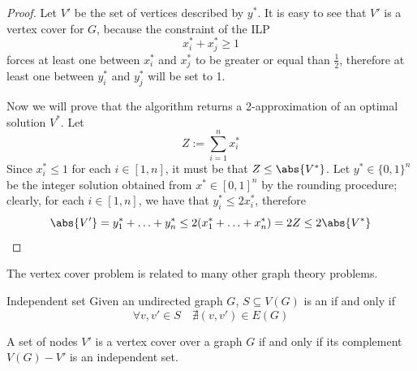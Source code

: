 \documentclass[a4paper, 12pt]{report}
\begin{document}

    \begin{proof}
        Let $V'$ be the set of vertices described by $y^*$. It is easy to see that $V'$ is a vertex cover for $G$, because the constraint of the ILP $$x^*_i + x^*_j \ge 1$$ forces at least one between $x^*_i$ and $x^*_j$ to be greater or equal than $\frac{1}{2}$, therefore at least one between $y^*_i$ and $y_j^*$ will be set to 1.

        Now we will prove that the algorithm returns a 2-approximation of an optimal solution $V^*$. Let $$Z := \sum_{i = 1}^n{x^*_i}$$ Since $x^*_i \le 1$ for each $i \in [1, n]$, it must be that $Z \le \abs{V^*}$. Let $y^* \in \{0, 1\}^n$ be the integer solution obtained from $x^* \in [0, 1]^n$ by the rounding procedure; clearly, for each $i \in [1, n]$, we have that $y^*_i \le 2x^*_i$, therefore $$\abs{V'} = y^*_1 + \ldots + y^*_n \le 2 (x^*_1 + \ldots + x^*_n) = 2Z \le 2 \abs{V^*}$$
    \end{proof}

    The vertex cover problem is related to many other graph theory problems.

    \begin{frameddefn}{Independent set}
        Given an undirected graph $G$, $S \subseteq V(G)$ is an  if and only if $$\forall v, v' \in S \quad \nexists (v, v') \in E(G)$$
    \end{frameddefn}

    \begin{framedthm}{}
        A set of nodes $V'$ is a vertex cover over a graph $G$ if and only if its complement $V(G) - V'$ is an independent set.
    \end{framedthm}

\end{document}
